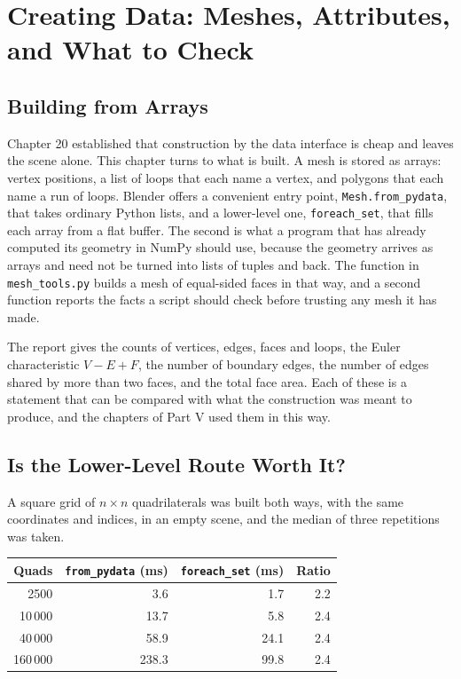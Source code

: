 \chapter{Creating Data: Meshes, Attributes, and What to Check}

\section{Building from Arrays}

Chapter 20 established that construction by the data interface is cheap and leaves the scene alone. This chapter turns to what is built. A mesh is stored as arrays: vertex positions, a list of loops that each name a vertex, and polygons that each name a run of loops. Blender offers a convenient entry point, \texttt{Mesh.from\_pydata}, that takes ordinary Python lists, and a lower-level one, \texttt{foreach\_set}, that fills each array from a flat buffer. The second is what a program that has already computed its geometry in NumPy should use, because the geometry arrives as arrays and need not be turned into lists of tuples and back. The function in \texttt{mesh\_tools.py} builds a mesh of equal-sided faces in that way, and a second function reports the facts a script should check before trusting any mesh it has made.



The report gives the counts of vertices, edges, faces and loops, the Euler characteristic $V-E+F$, the number of boundary edges, the number of edges shared by more than two faces, and the total face area. Each of these is a statement that can be compared with what the construction was meant to produce, and the chapters of Part V used them in this way.

\section{Is the Lower-Level Route Worth It?}

A square grid of $n\times n$ quadrilaterals was built both ways, with the same coordinates and indices, in an empty scene, and the median of three repetitions was taken.

\begin{center}
\begin{tabular}{rrrr}
\toprule
Quads & \texttt{from\_pydata} (ms) & \texttt{foreach\_set} (ms) & Ratio\\
\midrule
2500 & 3.6 & 1.7 & 2.2\\
10\,000 & 13.7 & 5.8 & 2.4\\
40\,000 & 58.9 & 24.1 & 2.4\\
160\,000 & 238.3 & 99.8 & 2.4\\
\bottomrule
\end{tabular}
\end{center}


